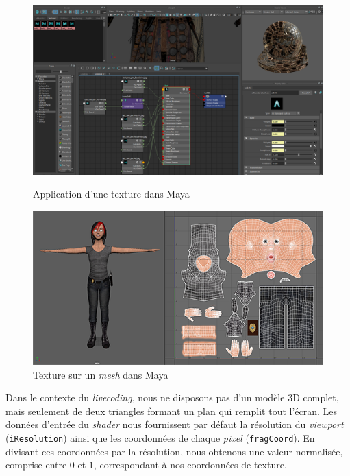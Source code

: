 \begin{figure}[h]
  \begin{minipage}[b]{0.45\linewidth}
    \centering
    \includegraphics[width=\linewidth]{images/shaders/maya_text00.png}
    \caption{Application d'une texture dans Maya}
    \label{maya_text00}
  \end{minipage}
  \hspace{0.1\linewidth} %
  \begin{minipage}[b]{0.45\linewidth}
    \centering
    \includegraphics[width=\linewidth]{images/shaders/maya_text01.png}
    \caption{Texture sur un \textit{mesh} dans Maya}
    \label{maya_text01}
  \end{minipage}
\end{figure}

Dans le contexte du  \textit{livecoding}, nous ne disposons pas d'un modèle 3D complet, mais seulement de deux triangles formant un plan qui remplit tout l'écran. Les données d'entrée du \textit{shader} nous fournissent par défaut la résolution du \textit{viewport} (\lstinline{iResolution}) ainsi que les coordonnées de chaque \textit{pixel} (\lstinline{fragCoord}). En divisant ces coordonnées par la résolution, nous obtenons une valeur normalisée, comprise entre $0$ et $1$, correspondant à nos coordonnées de texture.

